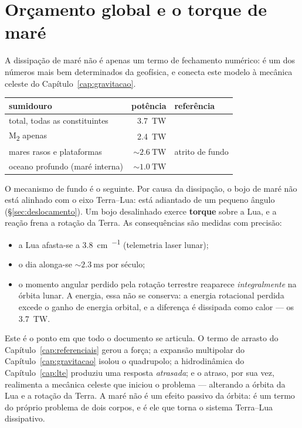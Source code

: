 \documentclass[11pt,a4paper,oneside]{report}
\theoremstyle{definition}
\theoremstyle{plain}
\theoremstyle{remark}
\begin{document}
\section{Orçamento global e o torque de maré}
\label{sec:torque}

A dissipação de maré não é apenas um termo de fechamento numérico: é um dos
números mais bem determinados da geofísica, e conecta este modelo à mecânica
celeste do Capítulo~\ref{cap:gravitacao}.

\begin{center}
\begin{tabular}{@{}lrl@{}}
\toprule
sumidouro & potência & referência \\
\midrule
total, todas as constituintes & \SI{3.7}{\tera\watt} & \cite{munk1998} \\
M\textsubscript{2} apenas & \SI{2.4}{\tera\watt} & \cite{egbert2000} \\
mares rasos e plataformas & $\sim\SI{2.6}{\tera\watt}$ & atrito de fundo \\
oceano profundo (maré interna) & $\sim\SI{1.0}{\tera\watt}$ & \cite{egbert2000} \\
\bottomrule
\end{tabular}
\end{center}

O mecanismo de fundo é o seguinte. Por causa da dissipação, o bojo de maré não
está alinhado com o eixo Terra--Lua: está adiantado de um pequeno ângulo
(\S\ref{sec:deslocamento}). Um bojo desalinhado exerce \textbf{torque} sobre a
Lua, e a reação frena a rotação da Terra. As consequências são medidas com
precisão:

\begin{itemize}
\item a Lua afasta-se a \SI{3.8}{\centi\meter\per\ano} (telemetria laser
  lunar);
\item o dia alonga-se $\sim\SI{2.3}{\milli\second}$ por século;
\item o momento angular perdido pela rotação terrestre reaparece
  \emph{integralmente} na órbita lunar. A energia, essa não se conserva: a
  energia rotacional perdida excede o ganho de energia orbital, e a diferença é
  dissipada como calor — os \SI{3.7}{\tera\watt}.
\end{itemize}

\begin{caixa}
Este é o ponto em que todo o documento se articula. O termo de arrasto do
Capítulo~\ref{cap:referenciais} gerou a força; a expansão multipolar do
Capítulo~\ref{cap:gravitacao} isolou o quadrupolo; a hidrodinâmica do
Capítulo~\ref{cap:lte} produziu uma resposta \emph{atrasada}; e o atraso, por
sua vez, realimenta a mecânica celeste que iniciou o problema — alterando a
órbita da Lua e a rotação da Terra. A maré não é um efeito passivo da órbita:
é um termo do próprio problema de dois corpos, e é ele que torna o sistema
Terra--Lua dissipativo.
\end{caixa}
\end{document}
